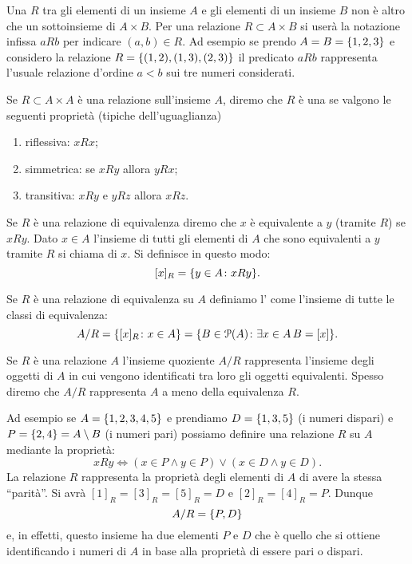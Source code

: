 Una  $R$ tra gli elementi di un insieme $A$ e gli elementi
di un insieme $B$ non è altro che un sottoinsieme di $A\times B$.
Per una relazione $R\subset A\times B$ si userà la notazione infissa
$aRb$ per indicare $(a,b)\in R$.
Ad esempio se prendo $A=B={\left\{ 1,2,3 \right\}}$ e considero la relazione $R={\left\{ (1,2),(1,3),(2,3) \right\}}$
il predicato $aRb$ rappresenta l'usuale relazione d'ordine $a<b$ sui
tre numeri considerati.

\begin{definition}
  Se $R\subset A\times A$ è una relazione sull'insieme $A$, diremo che 
  $R$ è una  se valgono le seguenti proprietà
  (tipiche dell'uguaglianza)
  \begin{enumerate}
    \item riflessiva: $x R x$;
    \item simmetrica: se $x R y$ allora $y R x$;
    \item transitiva: $x R y$ e $yRz$ allora $x R z$.
  \end{enumerate}
  Se $R$ è una relazione di equivalenza diremo che $x$ è equivalente a $y$ 
  (tramite $R$) se $xRy$.
  Dato $x \in A$ l'insieme di tutti gli elementi di $A$ che sono equivalenti 
  a $y$ tramite $R$ si chiama  di $x$. 
  Si definisce in questo modo:
  \[
    [x]_R = {\left\{ y\in A \colon xRy \right\}}.  
  \]

  Se $R$ è una relazione di equivalenza su $A$ definiamo l'
  come l'insieme di tutte le classi di equivalenza:
  \[
   A/R 
   = {\left\{ [x]_R\colon x\in A \right\}} 
   = {\left\{ B\in \mathcal P(A)\colon \exists x\in A\, B=[x] \right\}}.  
  \]
\end{definition}

Se $R$ è una relazione $A$ l'insieme quoziente $A/R$ rappresenta l'insieme 
degli oggetti di $A$ in cui vengono identificati tra loro gli oggetti equivalenti.
Spesso diremo che $A/R$ rappresenta $A$ a meno della equivalenza $R$.

Ad esempio se $A={\left\{ 1,2,3,4,5 \right\}}$ e prendiamo $D={\left\{ 1,3,5 \right\}}$ (i numeri dispari)
e $P={\left\{ 2,4 \right\}}=A\setminus B$ 
(i numeri pari) possiamo definire una relazione $R$ su $A$ mediante la proprietà:
\[
 x R  y \iff (x\in P \land y\in P) \lor (x\in D \land y\in D).
\]
La relazione $R$ rappresenta la proprietà degli elementi di $A$ 
di avere la stessa ``parità''. 
Si avrà $[1]_R = [3]_R=[5]_R= D$ e $[2]_R=[4]_R=P$.
Dunque 
\[
   A/R = {\left\{ P,D \right\}}
\]
e, in effetti, questo insieme ha due elementi $P$ e $D$ che è quello 
che si ottiene identificando i numeri di $A$ in base alla proprietà 
di essere pari o dispari. 

